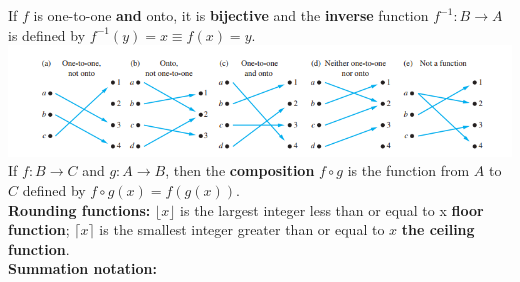 \documentclass[12pt]{article}
\newcommand{\floor}[1][x]{\lfloor #1\rfloor}
\newcommand{\ceil}[1][x]{\lceil #1\rceil}
\begin{document}
If $f$ is one-to-one \textbf{and} onto, it is \textbf{bijective} and the \textbf{inverse} function $f^{-1} : B \rightarrow A$ is defined by $f^{-1}(y) = x \equiv f(x) = y$. \\
\includegraphics[scale=0.8]{function_correspondance}\\
If $f : B \rightarrow C$ and $g : A \rightarrow B$, then the \textbf{composition} $f \circ g$ is the function from $A$ to $C$ defined by $f \circ g(x) = f(g(x))$. \\
\textbf{Rounding functions:} $\floor{}$ is the largest integer less than or equal to x \textbf{floor function}; $\ceil{}$ is the smallest integer greater than or equal to $x$ \textbf{the ceiling function}. \\
\textbf{Summation notation:}
\end{document}
